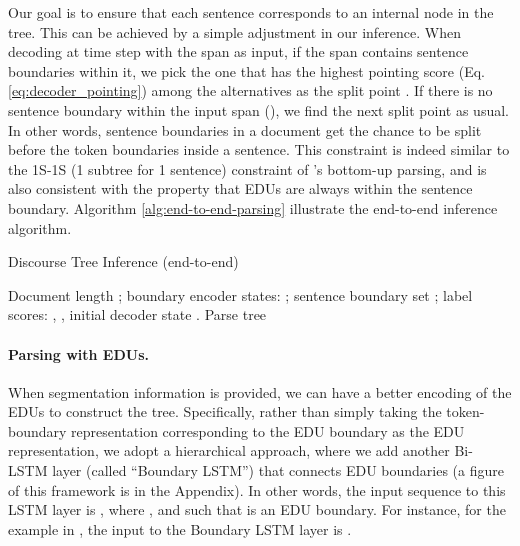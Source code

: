 Our goal is to ensure that each sentence corresponds to an internal node in the tree. This can be achieved by a simple adjustment in our inference. When decoding at time step  with the span  as input, if the span contains  sentence boundaries within it, we pick the one that has the highest pointing score (Eq. \ref{eq:decoder_pointing}) among the  alternatives as the split point . If there is no sentence boundary within the input span (), we find the next split point as usual. In other words, sentence boundaries in a document get the chance to be split before the token boundaries inside a sentence. This constraint is indeed similar to the 1S-1S (1 subtree for 1 sentence) constraint of \citet{joty-carenini-ng-mehdad-acl-13}'s bottom-up parsing, and is also consistent with the property that EDUs are always within the sentence boundary. Algorithm \ref{alg:end-to-end-parsing} illustrate the end-to-end inference algorithm.



\begin{algorithm}[t!]
\scriptsize
\captionsetup{font=scriptsize}
    \caption{Discourse Tree Inference (end-to-end)}
    \label{alg2}
    \begin{algorithmic}
    \REQUIRE Document length ; boundary encoder states: ; sentence boundary set  ;  label scores: , , initial decoder state .
    \ENSURE Parse tree 
\STATE   {}
    \STATE 
    \WHILE {}
        \STATE  {}
        \STATE  {}
         \IF{} 
            \STATE 
        \ELSE
            \STATE 
        \ENDIF
        
                \IF{}    
                    \STATE 
                    \STATE 
                \ELSIF{}    
                    \STATE 
                \ELSIF{}    
                    \STATE 
                \ENDIF
                \IF{}    
                    \STATE 
                \ENDIF
    \ENDWHILE
    \STATE 
  \end{algorithmic}
\label{alg:end-to-end-parsing}
\end{algorithm}

\paragraph{Parsing with EDUs.} When segmentation information is provided, we can have a better encoding of the EDUs to construct the tree. Specifically, rather than simply taking the token-boundary representation corresponding to the EDU boundary as the EDU representation, we adopt a hierarchical approach, where we add another Bi-LSTM layer (called ``Boundary LSTM'') that connects EDU boundaries (a figure of this framework is in the Appendix). In other words, the input sequence to this LSTM layer is , where ,  and  such that  is an EDU boundary. For instance, for the example in , the input to the Boundary LSTM layer is . 

